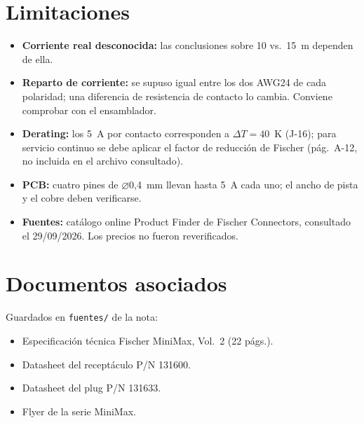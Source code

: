 \documentclass[11pt,a4paper]{article}
\begin{document}
\section{Limitaciones}
\begin{itemize}
  \item \textbf{Corriente real desconocida:} las conclusiones sobre 10 vs.\ 15~m dependen de ella.
  \item \textbf{Reparto de corriente:} se supuso igual entre los dos AWG24 de cada polaridad; una diferencia de resistencia de contacto lo cambia. Conviene comprobar con el ensamblador.
  \item \textbf{Derating:} los 5~A por contacto corresponden a $\Delta T=40$~K (J-16); para servicio continuo se debe aplicar el factor de reducción de Fischer (pág.~A-12, no incluida en el archivo consultado).
  \item \textbf{PCB:} cuatro pines de \ensuremath{\varnothing}0,4~mm llevan hasta 5~A cada uno; el ancho de pista y el cobre deben verificarse.
  \item \textbf{Fuentes:} catálogo online Product Finder de Fischer Connectors, consultado el 29/09/2026. Los precios no fueron reverificados.
\end{itemize}

\section{Documentos asociados}
Guardados en \texttt{fuentes/} de la nota:
\begin{itemize}
  \item Especificación técnica Fischer MiniMax, Vol.~2 (22 págs.).
  \item Datasheet del receptáculo P/N 131600.
  \item Datasheet del plug P/N 131633.
  \item Flyer de la serie MiniMax.
\end{itemize}
\end{document}
